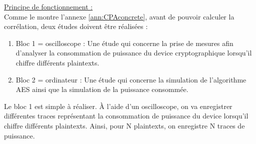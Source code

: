 \documentclass[10pt, oneside, a4paper]{article}
\begin{document}
\underline{Principe de fonctionnement :} \vspace{0.4 cm}\\
Comme le montre l'annexe \ref{ann:CPAconcrete}, avant de pouvoir calculer la corrélation, deux études doivent être réalisées : 
\begin{enumerate}
\item Bloc 1 = oscilloscope : Une étude qui concerne la prise de mesures afin d'analyser la consommation de puissance du device cryptographique lorsqu'il chiffre différents plaintexts.
\item Bloc 2 = ordinateur : Une étude qui concerne la simulation de l'algorithme AES ainsi que la simulation de la puissance consommée.
\end{enumerate}

\hspace{-0.5 cm}Le bloc 1 est simple à réaliser. À l'aide d'un oscilloscope, on va enregistrer différentes traces représentant la consommation de puissance du device lorsqu'il chiffre différents plaintexts. Ainsi, pour N plaintexts, on enregistre N traces de puissance.
 
\end{document}
